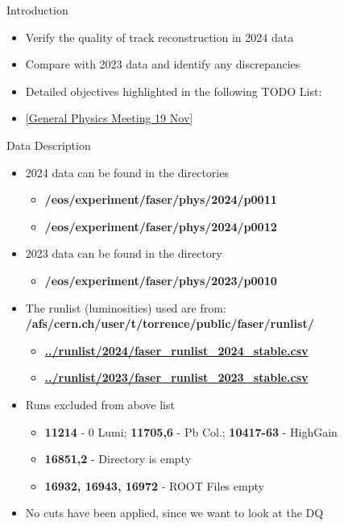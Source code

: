 \begin{frame}{Introduction}
    \begin{itemize}
        \item Verify the quality of track reconstruction in 2024 data
        \item Compare with 2023 data and identify any discrepancies
        \item Detailed objectives highlighted in the following TODO List:
        \item[] \href{https://indico.cern.ch/event/1476946/?note=304369}{[General Physics Meeting 19 Nov]}
    \end{itemize}
\end{frame}

\begin{frame}{Data Description}
    \begin{itemize}
        \item 2024 data can be found in the directories
              \begin{itemize}
                  \item \textbf{/eos/experiment/faser/phys/2024/p0011}
                  \item \textbf{/eos/experiment/faser/phys/2024/p0012}
              \end{itemize}
        \item 2023 data can be found in the directory
              \begin{itemize}
                  \item \textbf{/eos/experiment/faser/phys/2023/p0010}
              \end{itemize}
        \item The runlist (luminosities) used are from:
              \textbf{/afs/cern.ch/user/t/torrence/public/faser/runlist/}
              \begin{itemize}
                  \item \href{/afs/cern.ch/user/t/torrence/public/faser/runlist/2024/faser_runlist_2024_stable.csv}{\textbf{../runlist/2024/faser\_runlist\_2024\_stable.csv}}
                  \item \href{/afs/cern.ch/user/t/torrence/public/faser/runlist/2023/faser_runlist_2023_stable.csv}{\textbf{../runlist/2023/faser\_runlist\_2023\_stable.csv}}
              \end{itemize}
        \item Runs excluded from above list
              \begin{itemize}
                  \item \textbf{11214} - 0 Lumi; \textbf{11705,6} - Pb Col.; \textbf{10417-63} - HighGain
                  \item \textbf{16851,2} - Directory is empty
                  \item \textbf{16932, 16943, 16972} - ROOT Files empty
              \end{itemize}
        \item No cuts have been applied, since we want to look at the DQ
    \end{itemize}
\end{frame}

